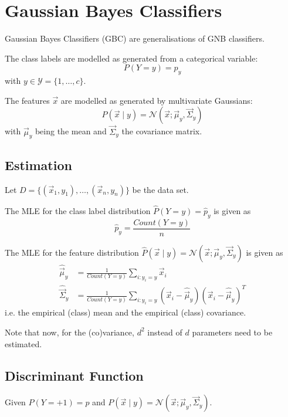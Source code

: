 \section{Gaussian Bayes Classifiers}
Gaussian Bayes Classifiers (GBC) are
generalisations of GNB classifiers.

The class labels are modelled as generated
from a categorical variable:
\begin{equation*}
    P(Y = y) = p_y
\end{equation*}
with $y \in \mathcal{Y} = \{1, \dotsc, c\}$.

The features $\vec{x}$ are modelled as
generated by multivariate Gaussians:
\begin{equation*}
    P(\vec{x} \mid y)
    = \mathcal{N}(\vec{x}; \vec{\mu}_y, \vec{\Sigma}_y)
\end{equation*}
with $\vec{\mu}_y$ being the mean and
$\vec{\Sigma}_y$ the covariance matrix.


\subsection{Estimation}
Let $D = \{(\vec{x}_1, y_1), \dotsc, (\vec{x}_n, y_n)\}$ be the data set.

The MLE for the class label distribution
$\hat{P}(Y = y) = \hat{p}_y$ is given as
\begin{equation*}
    \hat{p}_y = \frac{Count(Y = y)}{n}
\end{equation*}

The MLE for the feature distribution
$\hat{P}(\vec{x} \mid y) = \mathcal{N}(\vec{x}; \vec{\mu}_y, \vec{\Sigma}_y)$
is given as
\begin{align*}
    \hat{\vec{\mu}}_y
    &= \frac{1}{Count(Y = y)}
    \sum_{i : y_i = y}{\vec{x}_i} \\
    \hat{\vec{\Sigma}}_y
    &= \frac{1}{Count(Y = y)}
    \sum_{i : y_i = y}{
        (\vec{x}_i - \hat{\vec{\mu}}_y)
        (\vec{x}_i - \hat{\vec{\mu}}_y)^T
    }
\end{align*}
i.e. the empirical (class) mean and the
empirical (class) covariance.

Note that now, for the (co)variance,
$d^2$ instead of $d$ parameters need
to be estimated.


\subsection{Discriminant Function}
Given $P(Y = +1) = p$ and
$P(\vec{x} \mid y) = \mathcal{N}(\vec{x}; \vec{\mu}_y, \vec{\Sigma}_y)$.

